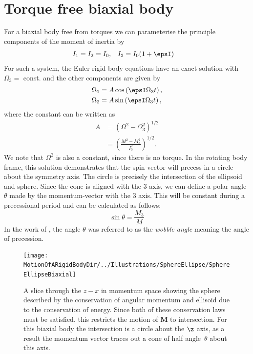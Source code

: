 \documentclass[/home/greg/Thesis/main/main.tex]{subfiles}
\begin{document}
\section{Torque free biaxial body}
For a biaxial body free from torques we can parameterise the principle components
of the moment of inertia by 
\begin{align}
    I_{1} = I_{2} = I_{0}, &&& I_{3} = I_{0}(1 + \epsI)
\end{align}
For such a system, the Euler rigid body equations have an
exact solution with $\Omega_{3}=$ const. and the other components are given by
\begin{align}
    \Omega_{1} &= A\cos\left(\epsI \Omega_{3} t\right),\\
    \Omega_{2} &= A\sin\left(\epsI \Omega_{3} t\right),
\end{align}
where the constant can be written as
\begin{align}
    A & = \left(\Omega^{2} - \Omega_{3}^{2}\right)^{1/2}\\
      & = \left(\frac{M^{2} - M_{3}^{2}}{I_{0}^{2}}\right)^{1/2}.
\end{align}
We note that $\Omega^{2}$ is also a constant, since there is no torque. In the rotating
body frame, this solution demonstrates that the spin-vector will precess in a
circle about the symmetry axis. The circle is precisely the intersection of the
ellipsoid and sphere. Since the cone is aligned with the $3$ axis, we can define
a polar angle $\theta$ made by the momentum-vector with the $3$ axis. This will be 
constant during a precessional period and can be calculated as follows:
\begin{equation}
\sin\theta = \frac{M_{3}}{M}
\label{eqn: sin theta}
\end{equation}
In the work of \citet{Jones2001}, the angle $\theta$ was referred to as the 
\emph{wobble angle} meaning the angle of precession.

\begin{figure}[htb]
\centering
\texttt{[image: \\MotionOfARigidBodyDir/../Illustrations/SphereEllipse/SphereEllipseBiaxial]}
\caption{A slice through the $z-x$ in momentum space showing the sphere described
by the conservation of angular momentum and ellisoid due to the conservation of
energy. Since both of these conservation laws must be satisfied, this restricts
the motion of $\mathbf{M}$ to intersection. For this biaxial body the intersection
is a circle about the $\z$ axis, as a result the momentum vector traces out a
cone of half angle~$\theta$ about this axis.}
\label{fig: sphere ellispod biaxial}
\end{figure}
\end{document}
